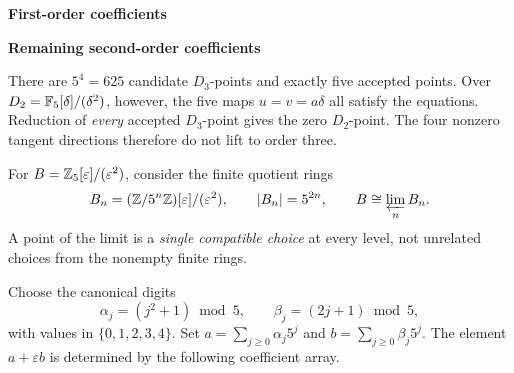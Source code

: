 \begin{minipage}[t]{.48\linewidth}\centering
{\sffamily\small\bfseries First-order coefficients}\par
{}
\end{minipage}\hfill
\begin{minipage}[t]{.48\linewidth}\centering
{\sffamily\small\bfseries Remaining second-order coefficients}\par
{}
\end{minipage}

There are $5^4=625$ candidate $D_3$-points and exactly five accepted points. Over $D_2=\mathbb F_5[\delta]/(\delta^2)$, however, the five maps $u=v=a\delta$ all satisfy the equations. Reduction of \emph{every} accepted $D_3$-point gives the zero $D_2$-point. The four nonzero tangent directions therefore do not lift to order three.


For $B=\mathbb Z_5[\varepsilon]/(\varepsilon^2)$, consider the finite quotient rings
\[
B_n=(\mathbb Z/5^n\mathbb Z)[\varepsilon]/(\varepsilon^2),
\qquad |B_n|=5^{2n},\qquad B\cong\varprojlim_n B_n.
\]
A point of the limit is a \emph{single compatible choice} at every level, not unrelated choices from the nonempty finite rings.

Choose the canonical digits
\[
\alpha_j=(j^2+1)\bmod5,\qquad \beta_j=(2j+1)\bmod5,
\]
with values in $\{0,1,2,3,4\}$. Set $a=\sum_{j\ge0}\alpha_j5^j$ and $b=\sum_{j\ge0}\beta_j5^j$. The element $a+\varepsilon b$ is determined by the following coefficient array.


